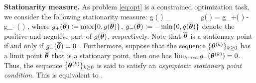 \documentclass[11pt]{article}
\makeatletter
\theoremstyle{t}
\DeclareRobustCommand*\cal{\@fontswitch\relax\mathcal}
\makeatother
\begin{document}
\textbf{Stationarity measure.} As problem \eqref{eq:opt} is a constrained optimization task, we consider the following stationarity measure:
\beq \label{eq:stationary_meas}
g ( \op ) \eqdef \inf_{ \param \in \Param } \frac{ {\cal L}'( \op , \param - \op  ) }{ \| \op - \param \|}~~~~~~~~g( \op )  = g_+( \op )  - g_- ( \op ) \eqsp,
\eeq
where  $g_+ ( \op ) \eqdef \max\{ 0, g(\op) \}$, $g_- ( \op )  \eqdef - \min\{0, g(\op)\}$ denote the positive and negative part of $g( \op ) $, respectively.
Note that $\op$ is a stationary point if and only if $g_-( \op ) = 0$ \citep{fletcher2002global}.
Furthermore, suppose that the sequence $\{ \hp{k} \}_{k \geq 0}$ has a limit point $\op$ that is a stationary point, then one has $\lim_{k \rightarrow \infty} g_-( \hp{k} ) = 0$.
Thus, the sequence $\{ \hp{k} \}_{k \geq 0}$ is said to satisfy an \emph{asymptotic stationary point condition}. This is equivalent to \citep[Definition 2.4]{mairal2015miso}.
\end{document}
